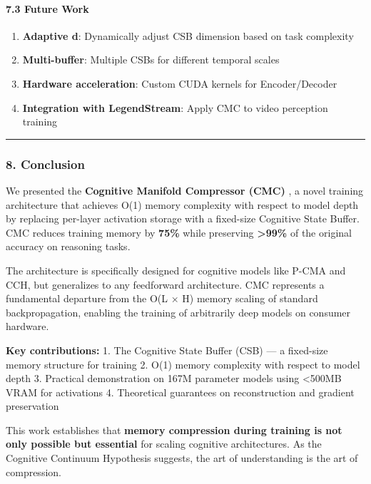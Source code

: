 \documentclass[
  11pt,
  a4paper,
]{article}
\providecommand{\tightlist}{%
  \setlength{\itemsep}{0pt}\setlength{\parskip}{0pt}}
\begin{document}
\paragraph{7.3 Future Work}\label{future-work}

\begin{enumerate}
\def\labelenumi{\arabic{enumi}.}
\tightlist
\item
  \textbf{Adaptive d}: Dynamically adjust CSB dimension based on task
  complexity
\item
  \textbf{Multi-buffer}: Multiple CSBs for different temporal scales
\item
  \textbf{Hardware acceleration}: Custom CUDA kernels for
  Encoder/Decoder
\item
  \textbf{Integration with LegendStream}: Apply CMC to video perception
  training
\end{enumerate}

\begin{center}\rule{0.5\linewidth}{0.5pt}\end{center}

\subsubsection{8. Conclusion}\label{conclusion-4}

We presented the \textbf{Cognitive Manifold Compressor (CMC)} , a novel
training architecture that achieves O(1) memory complexity with respect
to model depth by replacing per-layer activation storage with a
fixed-size Cognitive State Buffer. CMC reduces training memory by
\textbf{75\%} while preserving \textbf{\textgreater99\%} of the original
accuracy on reasoning tasks.

The architecture is specifically designed for cognitive models like
P-CMA and CCH, but generalizes to any feedforward architecture. CMC
represents a fundamental departure from the O(L × H) memory scaling of
standard backpropagation, enabling the training of arbitrarily deep
models on consumer hardware.

\textbf{Key contributions:} 1. The Cognitive State Buffer (CSB) --- a
fixed-size memory structure for training 2. O(1) memory complexity with
respect to model depth 3. Practical demonstration on 167M parameter
models using \textless500MB VRAM for activations 4. Theoretical
guarantees on reconstruction and gradient preservation

This work establishes that \textbf{memory compression during training is
not only possible but essential} for scaling cognitive architectures. As
the Cognitive Continuum Hypothesis suggests, the art of understanding is
the art of compression.
\end{document}
